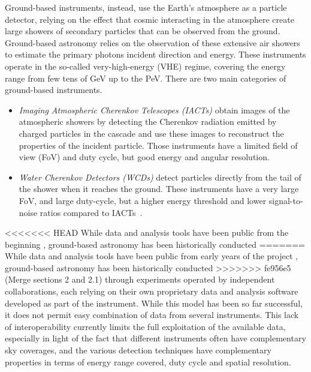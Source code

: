 \documentclass[longauth]{aa}
\begin{document}
Ground-based instruments, instead, use the Earth's atmosphere as a particle detector, relying on the effect that
cosmic \gammarays interacting in the atmosphere create large showers of secondary particles that can be observed from the ground.
Ground-based \gammaray astronomy relies on the observation of these extensive air showers to estimate the
primary \gammaray photons incident direction and energy.
These instruments operate in the so-called very-high-energy (VHE) regime,
covering the energy range from few tens of \si{GeV} up to the \si{PeV}.
There are two main categories of ground-based instruments.

\begin{itemize}
\setlength\itemsep{1em}

\item \textit{Imaging Atmospheric Cherenkov Telescopes (IACTs)} obtain images of the atmospheric showers
by detecting the Cherenkov radiation emitted by charged particles in the cascade and
use these images to reconstruct the properties of the incident particle.
Those instruments have a limited field of view (FoV) and duty cycle, but
good energy and angular resolution.
	
\item \textit{Water Cherenkov Detectors (WCDs)} detect particles directly from the tail of the
shower when it reaches the ground. These instruments have a very
large FoV, and large duty-cycle, but a higher energy threshold and
lower signal-to-noise ratios compared to IACTs~\citep{2015CRPhy..16..610D}.

\end{itemize}

<<<<<<< HEAD
While \fermi data and analysis tools have been public from the
beginning \citep{Atwood2009}, ground-based \gammaray astronomy has been historically conducted
=======
While \fermi data and analysis tools have been public from early years
of the project \citep{Atwood2009}, ground-based \gammaray astronomy has been historically conducted
>>>>>>> fe956e5 (Merge sections 2 and 2.1)
through experiments operated by independent collaborations, each relying
on their own proprietary data and analysis software developed as part of the
instrument. While this model has been so far successful, it does not
permit easy combination of data from several instruments. This lack of
interoperability currently limits the full exploitation of the
available \gammaray data, especially in light of the fact that different instruments often have
complementary sky coverages, and the various detection
techniques have complementary properties in terms of energy range covered,
duty cycle and spatial resolution.
\end{document}
